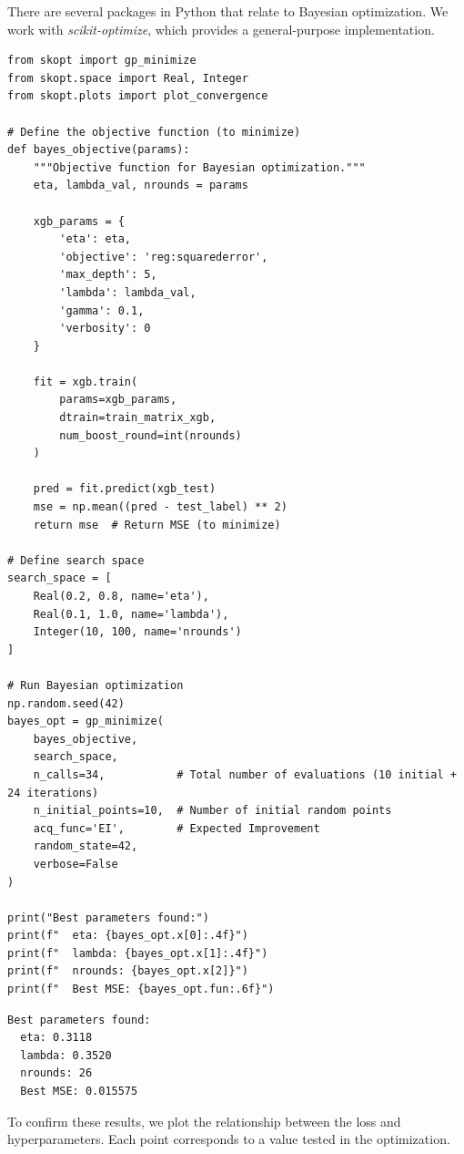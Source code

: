 There are several packages in Python that relate to Bayesian optimization. We work with \textit{scikit-optimize}, which provides a general-purpose implementation.

\begin{verbatim}
from skopt import gp_minimize
from skopt.space import Real, Integer
from skopt.plots import plot_convergence

# Define the objective function (to minimize)
def bayes_objective(params):
    """Objective function for Bayesian optimization."""
    eta, lambda_val, nrounds = params
    
    xgb_params = {
        'eta': eta,
        'objective': 'reg:squarederror',
        'max_depth': 5,
        'lambda': lambda_val,
        'gamma': 0.1,
        'verbosity': 0
    }
    
    fit = xgb.train(
        params=xgb_params,
        dtrain=train_matrix_xgb,
        num_boost_round=int(nrounds)
    )
    
    pred = fit.predict(xgb_test)
    mse = np.mean((pred - test_label) ** 2)
    return mse  # Return MSE (to minimize)

# Define search space
search_space = [
    Real(0.2, 0.8, name='eta'),
    Real(0.1, 1.0, name='lambda'),
    Integer(10, 100, name='nrounds')
]

# Run Bayesian optimization
np.random.seed(42)
bayes_opt = gp_minimize(
    bayes_objective,
    search_space,
    n_calls=34,           # Total number of evaluations (10 initial + 24 iterations)
    n_initial_points=10,  # Number of initial random points
    acq_func='EI',        # Expected Improvement
    random_state=42,
    verbose=False
)

print("Best parameters found:")
print(f"  eta: {bayes_opt.x[0]:.4f}")
print(f"  lambda: {bayes_opt.x[1]:.4f}")
print(f"  nrounds: {bayes_opt.x[2]}")
print(f"  Best MSE: {bayes_opt.fun:.6f}")
\end{verbatim}

\begin{verbatim}
Best parameters found:
  eta: 0.3118
  lambda: 0.3520
  nrounds: 26
  Best MSE: 0.015575
\end{verbatim}

To confirm these results, we plot the relationship between the loss and hyperparameters. Each point corresponds to a value tested in the optimization.

